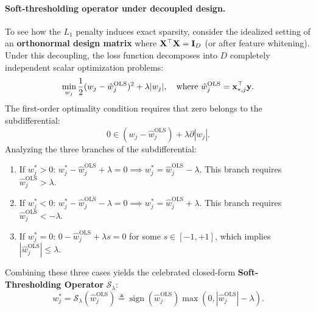 \paragraph{Soft-thresholding operator under decoupled design.}
To see how the $L_1$ penalty induces exact sparsity, consider the idealized setting of an \textbf{orthonormal design matrix} where $\mathbf{X}^\top \mathbf{X} = \mathbf{I}_D$ (or after feature whitening). Under this decoupling, the loss function decomposes into $D$ completely independent scalar optimization problems:
\begin{equation}
\min_{w_j} \frac{1}{2} (w_j - \hat{w}_j^{\text{OLS}})^2 + \lambda |w_j|, \quad \text{where } \hat{w}_j^{\text{OLS}} = \mathbf{x}_{*,j}^\top \mathbf{y}.
\label{eq:decoupled_lasso}
\end{equation}
The first-order optimality condition requires that zero belongs to the subdifferential:
\begin{equation}
0 \in (w_j - \hat{w}_j^{\text{OLS}}) + \lambda \partial |w_j|.
\label{eq:subgradient_optimality}
\end{equation}
Analyzing the three branches of the subdifferential:
\begin{enumerate}[noitemsep,topsep=2pt,parsep=0pt,partopsep=0pt]
  \item If $w_j^* > 0$: $w_j^* - \hat{w}_j^{\text{OLS}} + \lambda = 0 \implies w_j^* = \hat{w}_j^{\text{OLS}} - \lambda$. This branch requires $\hat{w}_j^{\text{OLS}} > \lambda$.
  \item If $w_j^* < 0$: $w_j^* - \hat{w}_j^{\text{OLS}} - \lambda = 0 \implies w_j^* = \hat{w}_j^{\text{OLS}} + \lambda$. This branch requires $\hat{w}_j^{\text{OLS}} < -\lambda$.
  \item If $w_j^* = 0$: $0 - \hat{w}_j^{\text{OLS}} + \lambda s = 0$ for some $s \in [-1, +1]$, which implies $|\hat{w}_j^{\text{OLS}}| \le \lambda$.
\end{enumerate}

Combining these three cases yields the celebrated closed-form \textbf{Soft-Thresholding Operator} $\mathcal{S}_\lambda$:
\begin{equation}
w_j^* = \mathcal{S}_\lambda(\hat{w}_j^{\text{OLS}}) \triangleq \operatorname{sign}(\hat{w}_j^{\text{OLS}}) \max\left(0, |\hat{w}_j^{\text{OLS}}| - \lambda\right).
\label{eq:soft_thresholding}
\end{equation}

